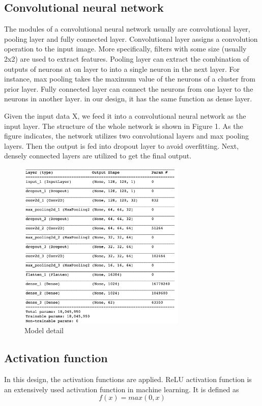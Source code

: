 \documentclass[twoside,twocolumn,10.8pt]{article}
\begin{document}
\subsection{Convolutional neural network}
The modules of a convolutional neural network usually are convolutional layer, pooling layer and fully connected layer. Convolutional layer assigns a convolution operation to the input image. More specifically, filters with some size (usually 2x2) are used to extract features. Pooling layer can extract the combination of outputs of neurons at on layer to into a single neuron in the next layer. For instance, max pooling takes the maximum value of the neurons of a cluster from prior layer. Fully connected layer can connect the neurons from one layer to the neurons in another layer. in our design, it has the same function as dense layer. 

\noindent Given the input data X, we feed it into a convolutional neural network as the input layer. The structure of the whole network is shown in Figure 1. As the figure indicates, the network utilizes two convolutional layers and max pooling layers. Then the output is fed into dropout layer to avoid overfitting. Next, densely connected layers are utilized to get the final output.

\begin{figure}[h]
\includegraphics[width=8cm]{model_detail.png}
\centering
\caption{Model detail}\label{fig3}
\end{figure}


\subsection{Activation function}

In this design, the activation functions are applied. 
ReLU activation function is an extensively used activation function in machine learning. It is defined as 
\begin{equation}
\label{eq:1}
f(x) = max(0,x)
\end{equation}
\end{document}
